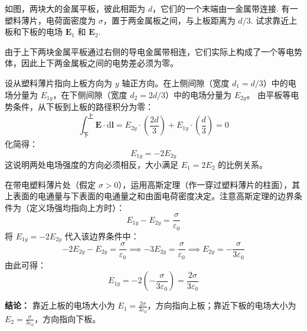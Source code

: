 \begin{exercise}\label{ex:15.17}
如图，两块大的金属平板，彼此相距为 $d$，它们的一个末端由一金属带连接. 有一塑料薄片，电荷面密度为 $\sigma$，置于两金属板之间，与上板距离为 $d/3$. 试求靠近上板和下板的电场 $\boldsymbol{E}_1$ 和 $\boldsymbol{E}_2$.
\begin{center}
\end{center}
\end{exercise}
\begin{solution}
由于上下两块金属平板通过右侧的导电金属带相连，它们实际上构成了一个等电势体，因此上下两金属板之间的电势差必须为零。

设从塑料薄片指向上板方向为 $y$ 轴正方向。在上侧间隙（宽度 $d_1 = d/3$）中的电场分量为 $E_{1y}$，在下侧间隙（宽度 $d_2 = 2d/3$）中的电场分量为 $E_{2y}$。
由平板等电势条件，从下板到上板的路径积分为零：
$$ \int_{\text{下}}^{\text{上}} \boldsymbol{E} \cdot \mathrm{d}\boldsymbol{l} = E_{2y} \cdot \left(\frac{2d}{3}\right) + E_{1y} \cdot \left(\frac{d}{3}\right) = 0 $$
化简得：
$$ E_{1y} = - 2 E_{2y} $$
这说明两处电场强度的方向必须相反，大小满足 $E_1 = 2E_2$ 的比例关系。

在带电塑料薄片处（假定 $\sigma > 0$），运用高斯定理（作一穿过塑料薄片的柱面），其上表面的电通量与下表面的电通量之和由面电荷密度决定。注意高斯定理的边界条件为（定义场强均指向上方时）：
$$ E_{1y} - E_{2y} = \frac{\sigma}{\varepsilon_0} $$
将 $E_{1y} = -2E_{2y}$ 代入该边界条件中：
$$ -2E_{2y} - E_{2y} = \frac{\sigma}{\varepsilon_0} \implies -3E_{2y} = \frac{\sigma}{\varepsilon_0} \implies E_{2y} = -\frac{\sigma}{3\varepsilon_0} $$
由此可得：
$$ E_{1y} = -2 \left( -\frac{\sigma}{3\varepsilon_0} \right) = \frac{2\sigma}{3\varepsilon_0} $$

\textbf{结论：}
靠近上板的电场大小为 $E_1 = \frac{2\sigma}{3\varepsilon_0}$，方向指向上板；靠近下板的电场大小为 $E_2 = \frac{\sigma}{3\varepsilon_0}$，方向指向下板。
\end{solution}



